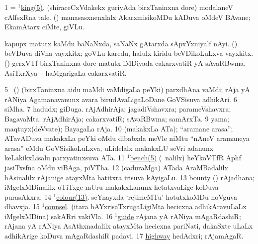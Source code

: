 \noindent
\gl{\pagu}
\bmng
\bnum
\num{1}  = \hyperlink{king(1)5}{$^1$king(5)}. 
  
\banum
{} (shiraceCxVdakekx guriyAda birxTaninxna dore) modalaneV cAlfsxRna tale. 
 (\rUpa) manasasxnenxlalx AkarxmisikoMDu kADuva oMdeV BAvane; EkamAtarx ciMte, giVLu. 
\eanum
\numie
{}  
\banum
{} kapupx matutx kaMdu baNaNxda, saNaNx gAtarxda sApxYxniyalf nAyi. 
 (\rUpa) beVDuva diVna vayxkitx; goVLu karedu, halulx kiridu beVDikoLuLxva vayxkitx. 
\eanum
\numie
{}  (\ca) 
\banum
{} gerxVTf birxTaninxna dore matutx iMDiyada cakarxvatiR yA sAvaRBwma. 
 AsiTxrXya -- haMgarigaLa cakarxvatiR. 
\eanum
\numie
\num{5}  \nA\ (\vaMlAM) (birxTaninxna aidu maMdi vaMdigaLa peYki) parxdhAna vaMdi; rAja yA rANiya Agamanavanunx avara birudAvaLigaLoDane GoVSisuva adhikAri. 
\num{6}  siMha. 
\num{7}  hadudx; giDuga. 
  
\banum
{} rAjAdhirAja; jagadiVshavxra; parameVshavxra; BagavaMta. 
 rAjAdhirAja; cakarxvatiR; sAvaRBwma; samArxTa. 
\eanum
\numie
\num{9}  yama; maqtuyx(deVvate); BayagaLa rAja. 
\num{10}  (makakxLa ATa); ``aramane arasa''; ATavADuva makakxLa peYki oMdu dibabxda meVle niMtu ``nAneV aramaneya arasa'' eMdu GoVSisikoLuLxva, uLidelalx makakxLU seVri adanunx keLakikxLisalu parxyatinxsuva ATa. 
\num{11}  \hyperref{kandict_b.pdf}{B}{bench(1)5}{$^1$bench(5)} (\UK\ nalilx) heYkoVTfR Aphf jasiTxsfna oMdu viBAga, piVTha. 
\num{12}  (caduraMga) ATada AraMBadalilx hAsinalilx rAjanige atayxMta hatitxra irisuva kAyigaLu. 
\num{13}  \hyperref{kandict_b.pdf}{B}{bounty pagu(1)}{bounty} (\ca) rAjadhana; iMgelxMDinalilx oTiTxge mUru makakxLanunx hetatxvaLige koDuva purasAkxra. 
\num{14}  \hyperref{kandict_c.pdf}{C}{colour(1)13}{$^1$colour(13)}. seYnayxda `rejimeMTu' hotutxkoMDu hoVguva dhavxja. 
\num{15}  \hyperref{kandict_c.pdf}{C}{counsel(1) pagu(2)}{$^1$counsel}. (itara bAYxrisaTxrugaLigiMta hecicxna adhikAravuLaLx iMgelxMDina) sakARri vakiVla. 
\num{16}  \hyperref{kandict_g.pdf}{G}{guide(1) pagu}{$^1$guide} rAjana yA rANiya mAgaRdashiR; rAjana yA rANiya AsAthxnadalilx atayxMta hecicxna pariNati, dakaSxte uLaLx adhikArige koDuva mAgaRdashiR padavi. 
\num{17}  \hyperref{kandict_h.pdf}{H}{highway}{highway} hedAdxri; rAjamAgaR. 
